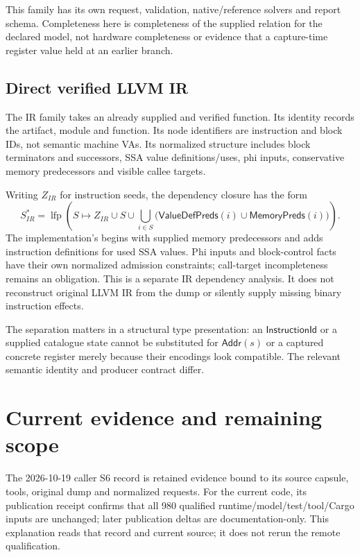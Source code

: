 \documentclass[11pt,a4paper]{article}
\newcommand{\ty}[1]{\mathsf{#1}}
\newcommand{\lfp}{\operatorname{lfp}}
\newcommand{\code}[1]{\texttt{\detokenize{#1}}}
\begin{document}
This family has its own request, validation, native/reference solvers and
report schema. Completeness here is completeness of the supplied relation
for the declared model, not hardware completeness or evidence that a
capture-time register value held at an earlier branch.

\subsection{Direct verified LLVM IR}
The IR family takes an already supplied and verified function. Its identity
records the artifact, module and function. Its node identifiers are instruction
and block IDs, not semantic machine VAs. Its normalized structure includes block
terminators and successors, SSA value definitions/uses, phi inputs,
conservative memory predecessors and visible callee targets.

Writing $Z_{IR}$ for instruction seeds, the dependency closure has the form
\[
 S^*_{IR}=\lfp\!\left(
 S\mapsto Z_{IR}\cup S\cup
 \bigcup_{i\in S}
 \bigl(\ty{ValueDefPreds}(i)\cup\ty{MemoryPreds}(i)\bigr)
 \right).
\]
The implementation's \code{dependency_preds} begins with supplied memory
predecessors and adds instruction definitions for used SSA values.
Phi inputs and block-control facts have their own normalized admission
constraints; call-target incompleteness remains an obligation. This is a
separate IR dependency analysis. It does not reconstruct original LLVM IR
from the dump or silently supply missing binary instruction effects.

The separation matters in a structural type presentation: an
$\ty{InstructionId}$ or a supplied catalogue state cannot be substituted for
$\ty{Addr}(s)$ or a captured concrete register merely because their encodings
look compatible. The relevant semantic identity and producer contract differ.

\section{Current evidence and remaining scope}
\label{app:evidence}
The 2026-10-19 caller S6 record is retained evidence bound to its source
capsule, tools, original dump and normalized requests. For the current
\code{184a181} code, its publication receipt confirms that all 980 qualified
runtime/model/test/tool/Cargo inputs are unchanged; later publication deltas
are documentation-only. This explanation reads that record and current source;
it does not rerun the remote qualification.
\end{document}
